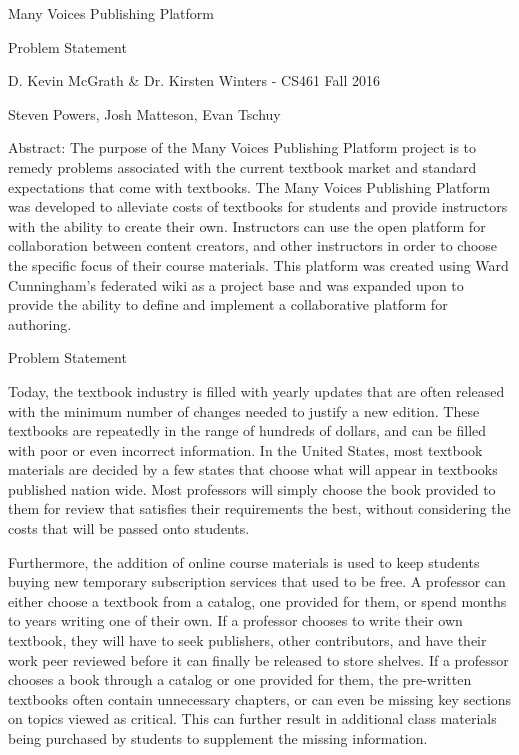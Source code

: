 \documentclass[letterpaper, 10pt, draftclsnofoot, onecolumn]{IEEEtran}
\begin{document}
\begin{titlepage}
\centering
{\huge Many Voices Publishing Platform\par}
{\LARGE Problem Statement\par}
{\vspace{2mm}}
{\large D. Kevin McGrath \& Dr. Kirsten Winters -  CS461 Fall 2016\par}
{\large Steven Powers, Josh Matteson, Evan Tschuy\par}
{\vspace{10mm}}
{\large Abstract:  The purpose of the Many Voices Publishing Platform project is to remedy problems 
associated with the current textbook market and standard expectations that come 
with textbooks. The Many Voices Publishing Platform was developed to alleviate 
costs of textbooks for students and provide instructors with the ability 
to create their own. Instructors can use the open platform for collaboration between 
content creators, and other instructors in order to choose the specific focus of their course materials. 
This platform was created using Ward Cunningham's federated wiki as a project 
base and was expanded upon to provide the ability to define and implement a 
collaborative platform for authoring.\par}
\end{titlepage}

\vspace{1pc}
\centerline{\sc \large Problem Statement}
\vspace{2pc}

 Today, the textbook industry is filled with yearly updates that are often released with the
minimum number of changes needed to justify a new edition. These textbooks are repeatedly in the range of hundreds of dollars, 
and can be filled with poor or even incorrect information. In the United States, most textbook materials are 
decided by a few states that choose what will appear in textbooks published nation wide. Most professors will
simply choose the book provided to them for review that satisfies their requirements the best, without 
considering the costs that will be passed onto students.
 
Furthermore, the addition of online course materials is used to keep students buying new 
temporary subscription services that used to be free. A professor can either choose a textbook 
from a catalog, one provided for them, or spend months to years writing one of their own. 
If a professor chooses to write their own textbook, they will have to seek publishers,
other contributors, and have their work peer reviewed before it can finally be released to store shelves. 
If a professor chooses a book through a catalog or one provided for them, the pre-written textbooks 
often contain unnecessary chapters, or can even be missing key sections on topics viewed as critical. This can further result in 
additional class materials being purchased by students to supplement the missing information. \\
\end{document}
